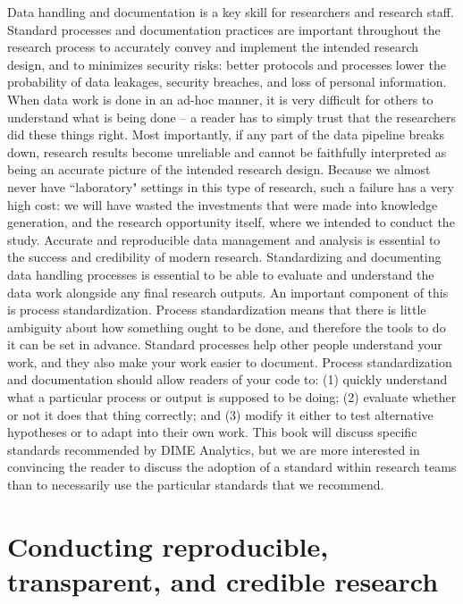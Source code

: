 \documentclass[]{tufte-book}
\begin{document}
Data handling and documentation is a key skill for researchers and
research staff. Standard processes and documentation practices are
important throughout the research process to accurately convey and
implement the intended research design, and to minimizes security risks:
better protocols and processes lower the probability of data leakages,
security breaches, and loss of personal information. When data work is
done in an ad-hoc manner, it is very difficult for others to understand
what is being done -- a reader has to simply trust that the researchers
did these things right. Most importantly, if any part of the data
pipeline breaks down, research results become unreliable and cannot be
faithfully interpreted as being an accurate picture of the intended
research design. Because we almost never have ``laboratory" settings in
this type of research, such a failure has a very high cost: we will have
wasted the investments that were made into knowledge generation, and the
research opportunity itself, where we intended to conduct the study.
Accurate and reproducible data management and analysis is essential to
the success and credibility of modern research. Standardizing and
documenting data handling processes is essential to be able to evaluate
and understand the data work alongside any final research outputs. An
important component of this is process standardization. Process
standardization means that there is little ambiguity about how something
ought to be done, and therefore the tools to do it can be set in
advance. Standard processes help other people understand your work, and
they also make your work easier to document. Process standardization and
documentation should allow readers of your code to: (1) quickly
understand what a particular process or output is supposed to be doing;
(2) evaluate whether or not it does that thing correctly; and (3) modify
it either to test alternative hypotheses or to adapt into their own
work. This book will discuss specific standards recommended by DIME
Analytics, but we are more interested in convincing the reader to
discuss the adoption of a standard within research teams than to
necessarily use the particular standards that we recommend.

\hypertarget{conducting-reproducible-transparent-and-credible-research}{%
\chapter{Conducting reproducible, transparent, and credible
research}\label{conducting-reproducible-transparent-and-credible-research}}
\end{document}
